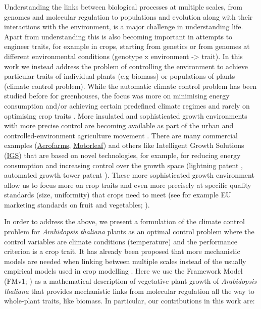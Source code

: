 Understanding the links between biological processes at multiple scales, from
genomes and molecular regulation to populations and evolution along with their
interactions with the environment, is a major challenge in understanding
life. Apart from understanding this is also becoming important in attempts to
engineer traits, for example in crops, starting from genetics or from genomes at
different environmental conditions (genotype x environment ->
trait). In this work we instead address the problem of controlling the
environment to achieve particular traits of individual plants (e.g biomass) or
populations of plants (climate control problem). While the automatic climate
control problem has been studied before for greenhouses, the focus was more on
minimising energy consumption and/or achieving certain predefined climate
regimes and rarely on optimising crop traits \citep{Chalabi1996,
udinktenCate1983, Challa_1990, Aaslyng2003}. More insulated and sophisticated
growth environments with more precise control are becoming available as part of
the urban and controlled-environment agriculture movement \citep{mok_strawberry_2014, despommier_farming_2013}. There are many
commercial examples (\href{https://aerofarms.com/}{Aerofarms},
\href{https://motorleaf.com/}{Motorleaf}) and others like Intelligent Growth
Solutions (\href{https://www.intelligentgrowthsolutions.com/}{IGS}) that are based on
novel technologies, for example, for reducing energy consumption and increasing
control over the growth space (lightning patent \citep{aykroyd_novel_2016},
automated growth tower patent \citep{aykroyd_automated_2018}). These more
sophisticated growth environment allow us to focus more on crop traits and even
more precisely at specific quality standards (size, uniformity) that crops need
to meet (see for example EU marketing standards on fruit and vegetables;
\citep{eu-543-2011}).

In order to address the above, we present a formulation of the climate control
problem for \textit{Arabidopsis thaliana} plants as an optimal control problem
\citep{kirk_optimal_2012} where the control variables are climate conditions
(temperature) and the performance criterion is a crop trait. It has already been
proposed that more mechanistic models are needed when linking between multiple
scales instead of the usually empirical models used in crop modelling
\citep{yin_role_2004, yin_modelling_2010}. Here we use the Framework Model (FMv1;
\citep{chew2014multiscale}) as a mathematical description of vegetative plant
growth of \textit{Arabidopsis thaliana} that provides mechanistic links from
molecular regulation all the way to whole-plant traits, like biomass. In
particular, our contributions in this work are:

